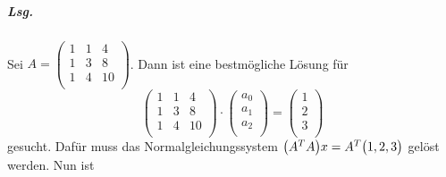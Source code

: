 \documentclass{scrreprt}
\begin{document}
\subparagraph{Lsg.} Sei $A = \begin{pmatrix}
  1 & 1 & 4  \\
  1 & 3 & 8  \\
  1 & 4 & 10 \\
\end{pmatrix}$.
Dann ist eine bestmögliche Lösung für
\[
  \begin{pmatrix}
    1 & 1 & 4  \\
    1 & 3 & 8  \\
    1 & 4 & 10 \\
  \end{pmatrix} \cdot \begin{pmatrix}
    a_0 \\
    a_1 \\
    a_2 \\
  \end{pmatrix} = \begin{pmatrix}
    1 \\
    2 \\
    3 \\
  \end{pmatrix}
\]
gesucht.
Dafür muss das Normalgleichungssystem $\qty\big(A^TA)x = A^T\qty\big(1, 2, 3)$
gelöst werden.
Nun ist
\end{document}
